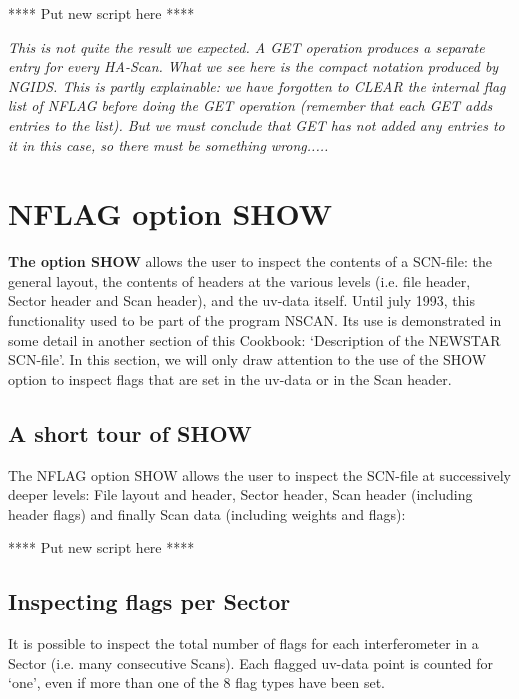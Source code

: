 **** Put new script here ****


{\it This is not quite the result we expected. A GET operation produces a
separate entry for every HA-Scan. What we see here is the compact notation
produced by NGIDS. This is partly explainable: we have forgotten to
CLEAR the internal flag list of NFLAG before doing the GET operation
(remember that each GET {\em adds} entries to the list).
But we must conclude that GET has not added any entries to it in this
case, so there must be something wrong.....}


\newpage
\section{NFLAG option SHOW}
\label{.show}

{\bf The option SHOW} allows the user to inspect the contents of a SCN-file:
the general layout, the contents of headers at the various levels
(i.e. file header, Sector header and Scan header), and the uv-data itself.
Until july 1993, this functionality used to be part of the program NSCAN.
Its use is demonstrated in some detail in another section of this Cookbook:
`Description of the NEWSTAR SCN-file'. In this section, we will only
draw attention to the use of the SHOW option to inspect flags that are set
in the uv-data or in the Scan header.


\subsection{A short tour of SHOW}
\label{.show-tour}

The NFLAG option SHOW allows the user to inspect the SCN-file at successively
deeper levels: File layout and header, Sector header, Scan header (including
header flags) and finally Scan data (including weights and flags):

**** Put new script here ****

\subsection{Inspecting flags per Sector}
\label{.show-sector}

It is possible to inspect the total number of flags for each interferometer
in a Sector (i.e. many consecutive Scans). Each flagged uv-data point is
counted for `one', even if more than one of the 8 flag types have been set.

